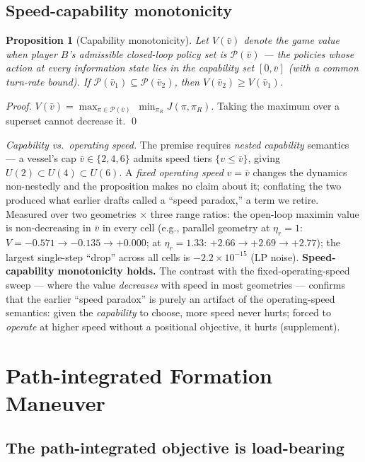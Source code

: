 \documentclass[12pt,a4paper]{article}
\newtheorem{proposition}{Proposition}
\newcommand{\etar}{\eta_r}
\begin{document}
\subsection{Speed-capability monotonicity}
\begin{proposition}[Capability monotonicity]\label{prop:mono}
Let $V(\bar v)$ denote the game value when player $B$'s admissible
closed-loop policy set is $\mathcal P(\bar v)$ --- the policies whose
action at every information state lies in the capability set $[0,\bar v]$
(with a common turn-rate bound).  If $\mathcal P(\bar v_1)\subseteq
\mathcal P(\bar v_2)$, then $V(\bar v_2)\ge V(\bar v_1)$.
\end{proposition}
\begin{proof}
$V(\bar v)=\max_{\pi\in\mathcal P(\bar v)}\ \min_{\pi_R}J(\pi,\pi_R)$.
Taking the maximum over a superset cannot decrease it.  \qed
\end{proof}

\noindent\emph{Capability vs.\ operating speed.}  The premise requires
\emph{nested capability} semantics --- a vessel's cap $\bar v\in\{2,4,6\}$
admits speed tiers $\{v\le\bar v\}$, giving $U(2)\subset U(4)\subset
U(6)$.  A \emph{fixed operating speed} $v=\bar v$ changes the dynamics
non-nestedly and the proposition makes no claim about it; conflating the
two produced what earlier drafts called a ``speed paradox,'' a term we
retire.  Measured over two geometries
$\times$ three range ratios: the open-loop maximin value is non-decreasing
in $\bar v$ in every cell (e.g., parallel geometry at $\etar=1$:
$V=-0.571\to-0.135\to+0.000$; at $\etar=1.33$:
$+2.66\to+2.69\to+2.77$); the largest single-step ``drop'' across all
cells is $-2.2\times10^{-15}$ (LP noise).  \textbf{Speed-capability
monotonicity holds.}  The contrast with the fixed-operating-speed sweep
--- where the value \emph{decreases} with speed in most geometries ---
confirms that the earlier ``speed paradox'' is purely an artifact of the
operating-speed semantics: given the \emph{capability} to choose, more
speed never hurts; forced to \emph{operate} at higher speed without a
positional objective, it hurts (supplement).



\section{Path-integrated Formation Maneuver}\label{sec:pathint}

\subsection{The path-integrated objective is load-bearing}\label{sec:b2}
\end{document}
